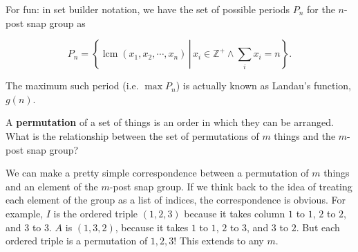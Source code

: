 \documentclass[../gatm_answers.tex]{subfiles}
\begin{document}
For fun: in set builder notation, we have the set of possible periods $P_n$ for the $n$-post snap group as

$$P_n=\left\{\operatorname{lcm} (x_1, x_2, \cdots, x_n)\, \left|\,x_i\in\mathbb{Z}^+ \land \sum_i x_i=n\right.\right\}.$$

The maximum such period (i.e. $\max P_n$) is actually known as Landau's function, $g(n)$.

\begin{outer_problem}
	\item A \textbf{permutation} of a set of things is an order in which they can be arranged. What is the relationship between the set of permutations of $m$ things and the $m$-post snap group?
\end{outer_problem}

We can make a pretty simple correspondence between a permutation of $m$ things and an element of the $m$-post snap group. If we think back to the idea of treating each element of the group as a list of indices, the correspondence is obvious. For example, $I$ is the ordered triple $(1,2,3)$ because it takes column $1$ to $1$, $2$ to $2$, and $3$ to $3$. $A$ is $(1,3,2)$, because it takes $1$ to $1$, $2$ to $3$, and $3$ to $2$. But each ordered triple is a permutation of ${1,2,3}$! This extends to any $m$.
\end{document}
